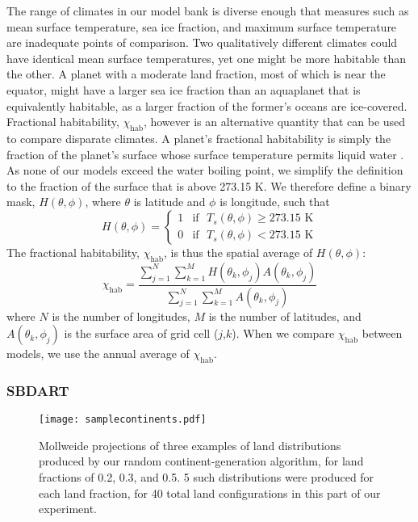 \documentclass[fleqn,usenatbib]{mnras}
\begin{document}
The range of climates in our model bank is diverse enough that measures such as mean surface temperature, sea ice fraction, and maximum surface temperature are inadequate points of comparison. Two qualitatively different climates could have identical mean surface temperatures, yet one might be more habitable than the other. A planet with a moderate land fraction, most of which is near the equator, might have a larger sea ice fraction than an aquaplanet that is equivalently habitable, as a larger fraction of the former's oceans are ice-covered. Fractional habitability, $\chi_\text{hab}$, however is an alternative quantity that can be used to compare disparate climates. A planet's fractional habitability is simply the fraction of the planet's surface whose surface temperature permits liquid water \citep{Spiegel2008}. As none of our models exceed the water boiling point, we simplify the definition to the fraction of the surface that is above 273.15 K. We therefore define a binary mask, $H(\theta,\phi)$, where $\theta$ is latitude and $\phi$ is longitude, such that
\begin{equation}
H(\theta,\phi) =
\begin{cases}
1 & \text{if }\,\,T_s(\theta,\phi) \geq 273.15\,\,\text{K} \\
0 & \text{if }\,\,T_s(\theta,\phi) < 273.15\,\,\text{K}
\end{cases}
\end{equation}
The fractional habitability, $\chi_\text{hab}$, is thus the spatial average of $H(\theta,\phi)$:
\begin{equation}
    \chi_\text{hab} = \frac{\sum\limits_{j=1}^{N}\sum\limits_{k=1}^{M}H(\theta_k,\phi_j)A(\theta_k,\phi_j)}{\sum\limits_{j=1}^{N}\sum\limits_{k=1}^{M}A(\theta_k,\phi_j)}
\end{equation}
where $N$ is the number of longitudes, $M$ is the number of latitudes, and $A(\theta_k,\phi_j)$ is the surface area of grid cell ($j$,$k$). When we compare $\chi_\text{hab}$ between models, we use the annual average of $\chi_\text{hab}$. 

\subsubsection{SBDART}

\begin{figure*}
\begin{center}
\texttt{[image: samplecontinents.pdf]}
\end{center}
\caption{Mollweide projections of three examples of land distributions produced by our random continent-generation algorithm, for land fractions of 0.2, 0.3, and 0.5. 5 such distributions were produced for each land fraction, for 40 total land configurations in this part of our experiment.}\label{obfig:continents}
\end{figure*}
\end{document}
